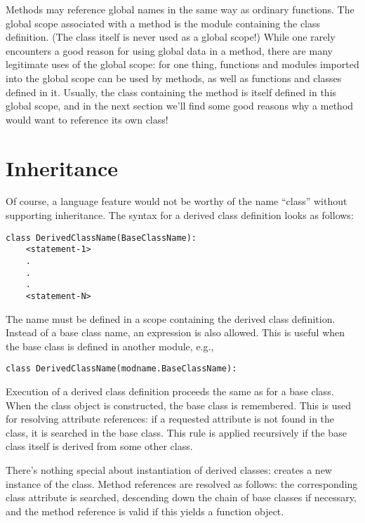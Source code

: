 \documentclass{manual}
\begin{document}
Methods may reference global names in the same way as ordinary
functions.  The global scope associated with a method is the module
containing the class definition.  (The class itself is never used as a
global scope!)  While one rarely encounters a good reason for using
global data in a method, there are many legitimate uses of the global
scope: for one thing, functions and modules imported into the global
scope can be used by methods, as well as functions and classes defined
in it.  Usually, the class containing the method is itself defined in
this global scope, and in the next section we'll find some good
reasons why a method would want to reference its own class!


\section{Inheritance \label{inheritance}}

Of course, a language feature would not be worthy of the name ``class''
without supporting inheritance.  The syntax for a derived class
definition looks as follows:

\begin{verbatim}
class DerivedClassName(BaseClassName):
    <statement-1>
    .
    .
    .
    <statement-N>
\end{verbatim}

The name  must be defined in a scope containing
the derived class definition.  Instead of a base class name, an
expression is also allowed.  This is useful when the base class is
defined in another module, e.g.,

\begin{verbatim}
class DerivedClassName(modname.BaseClassName):
\end{verbatim}

Execution of a derived class definition proceeds the same as for a
base class.  When the class object is constructed, the base class is
remembered.  This is used for resolving attribute references: if a
requested attribute is not found in the class, it is searched in the
base class.  This rule is applied recursively if the base class itself
is derived from some other class.

There's nothing special about instantiation of derived classes:
 creates a new instance of the class.  Method
references are resolved as follows: the corresponding class attribute
is searched, descending down the chain of base classes if necessary,
and the method reference is valid if this yields a function object.
\end{document}
